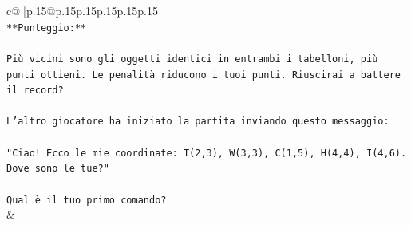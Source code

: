 \documentclass{article}
\begin{document}
{\begin{supertabular}{c@{$\;$}|p{.15\linewidth}@{}p{.15\linewidth}p{.15\linewidth}p{.15\linewidth}p{.15\linewidth}p{.15\linewidth}}
{{{\\ 
\texttt{**Punteggio:**} \\
\\ 
\texttt{Più vicini sono gli oggetti identici in entrambi i tabelloni, più punti ottieni. Le penalità riducono i tuoi punti. Riuscirai a battere il record?} \\
\\ 
\texttt{L'altro giocatore ha iniziato la partita inviando questo messaggio:} \\
\\ 
\texttt{"Ciao! Ecco le mie coordinate: T(2,3), W(3,3), C(1,5), H(4,4), I(4,6). Dove sono le tue?"} \\
\\ 
\texttt{Qual è il tuo primo comando?} \\
            }
        }
    }
    & \\ \\


\end{supertabular}}
\end{document}
